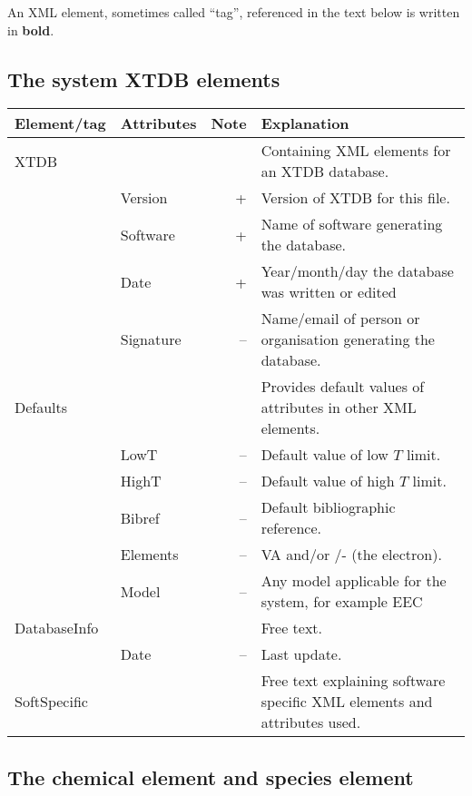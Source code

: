 \documentclass{article}
\begin{document}
An XML element, sometimes called ``tag'', referenced in the text below
is written in {\bf bold}.

\subsection{The system XTDB elements}

\bigskip
\begin{tabular}{|p{} p{} r p{}|}\hline
  Element/tag & Attributes & Note & Explanation\\\hline

  XTDB    & && Containing XML elements for an XTDB database.\\
          & Version & + & Version of XTDB for this file.\\
          &Software & + & Name of software generating the database.\\
          &Date     & + & Year/month/day the database was written or edited\\
          &Signature& -- & Name/email of person or organisation generating the database.\\\hline
  
  Defaults & && Provides default values of attributes in other XML elements.\\
           & LowT & -- & Default value of low $T$ limit.\\
           & HighT & -- & Default value of high $T$ limit.\\
           & Bibref & -- & Default bibliographic reference. \\
           & Elements & -- & VA and/or /- (the electron).\\
           & Model & -- & Any model applicable for the system, for example EEC\\\hline

  DatabaseInfo & && Free text.\\
  & Date & -- & Last update.\\\hline

  SoftSpecific & && Free text explaining software specific XML
  elements and attributes used.\\\hline
  
\end{tabular}

\subsection{The chemical element and species element}
\end{document}
